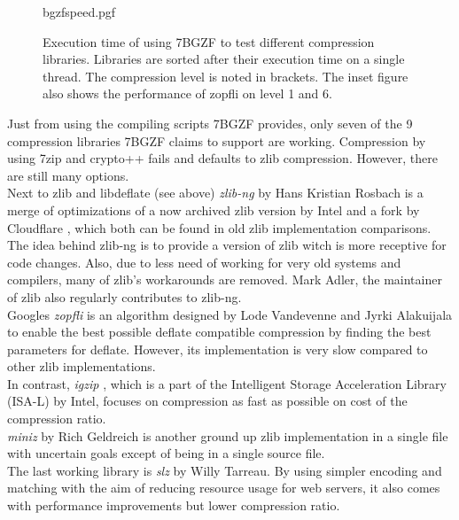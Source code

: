 \begin{figure}[ht]
        {bgzfspeed.pgf}
    \caption{Execution time of \sort using 7BGZF to test different compression libraries. Libraries are sorted after their execution time on a single thread. The compression level is noted in brackets. The inset figure also shows the performance of zopfli on level 1 and 6.}
    \label{fig:bgzfspeed}
\end{figure}
Just from using the compiling scripts 7BGZF provides, only seven of the 9 compression libraries 7BGZF claims to support are working. Compression by using 7zip and crypto++ fails and defaults to zlib compression. However, there are still many options.\\
Next to zlib and libdeflate (see above) \textit{zlib-ng} \cite{noauthor_zlib-ngzlib-ng_2024} by Hans Kristian Rosbach is a merge of optimizations of a now archived zlib version by Intel \cite{noauthor_intelzlib_2024} and a fork by Cloudflare \cite{noauthor_cloudflarezlib_2024}, which both can be found in old zlib implementation comparisons. The idea behind zlib-ng is to provide a version of zlib witch is more receptive for code changes. Also, due to less need of working for very old systems and compilers, many of zlib's workarounds are removed. Mark Adler, the maintainer of zlib also regularly contributes to zlib-ng.\\
Googles \textit{zopfli} \cite{noauthor_googlezopfli_2024} is an algorithm designed by Lode Vandevenne and Jyrki Alakuijala to enable the best possible deflate compatible compression by finding the best parameters for deflate. However, its implementation is very slow compared to other zlib implementations. \\
In contrast, \textit{igzip} \cite{tucker_isa-l_2017}, which is a part of the Intelligent Storage Acceleration Library (ISA-L) \cite{noauthor_intelisa-l_2024} by Intel, focuses on compression as fast as possible on cost of the compression ratio. \\
\textit{miniz} \cite{noauthor_richgel999miniz_nodate} by Rich Geldreich is another ground up zlib implementation in a single file with uncertain goals except of being in a single source file. \\
The last working library is \textit{slz} \cite{tarreau_wtarreaulibslz_2024} by Willy Tarreau. By using simpler encoding and matching with the aim of reducing resource usage for web servers, it also comes with performance improvements but lower compression ratio.\\

